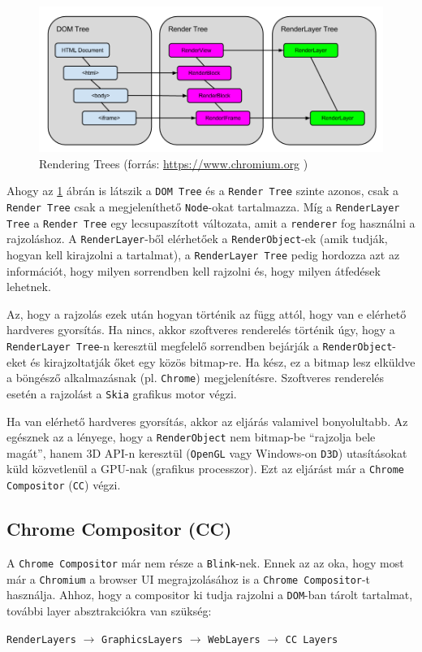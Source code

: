 \documentclass[12pt]{report}
\let\origurl\url
\renewcommand{\url}[1]{%
    \textcolor{blue}{\origurl{#1}}
}
\begin{document}
\begin{figure}[h]
    \centering
    \includegraphics[scale=0.45]{rendering_trees}
    \caption{
        \label{fig-rendering-trees}
        Rendering Trees (forrás: \url{https://www.chromium.org} \cite{bib-chromium-oopifs})
    }
\end{figure}

Ahogy az \ref{fig-rendering-trees} ábrán is látszik a \texttt{DOM Tree} és a
\texttt{Render Tree} szinte azonos, csak a \texttt{Render Tree} csak a megjeleníthető
\texttt{Node}-okat tartalmazza. Míg a \texttt{RenderLayer Tree} a \texttt{Render Tree} egy
lecsupaszított változata, amit a \texttt{renderer} fog használni a rajzoláshoz.
A \texttt{RenderLayer}-ből elérhetőek a \texttt{RenderObject}-ek (amik tudják, hogyan
kell kirajzolni a tartalmat), a \texttt{RenderLayer Tree} pedig hordozza azt az információt,
hogy milyen sorrendben kell rajzolni és, hogy milyen átfedések lehetnek.

Az, hogy a rajzolás ezek után hogyan történik az függ attól, hogy van e elérhető hardveres
gyorsítás. Ha nincs, akkor szoftveres renderelés történik úgy, hogy a \\
\texttt{RenderLayer Tree}-n keresztül megfelelő sorrendben bejárják a
\texttt{RenderObject}-eket és kirajzoltatják őket egy közös bitmap-re. Ha kész, ez a bitmap
lesz elküldve a böngésző alkalmazásnak (pl. \texttt{Chrome}) megjelenítésre. Szoftveres
renderelés esetén a rajzolást a \texttt{Skia} grafikus motor végzi.

Ha van elérhető hardveres gyorsítás, akkor az eljárás valamivel bonyolultabb. Az egésznek az
a lényege, hogy a \texttt{RenderObject} nem bitmap-be ``rajzolja bele magát'', hanem 3D API-n
keresztül (\texttt{OpenGL} vagy Windows-on \texttt{D3D}) utasításokat küld közvetlenül a
GPU-nak (grafikus processzor). Ezt az eljárást már a \texttt{Chrome Compositor} (\texttt{CC})
végzi.
\cite{bib-chromium-gpu, bib-chromium-oopifs}

\subsection{Chrome Compositor (CC)}
A \texttt{Chrome Compositor} már nem része a \texttt{Blink}-nek.
Ennek az az oka, hogy most már a \texttt{Chromium} a browser UI megrajzolásához is a
\texttt{Chrome Compositor}-t használja.
Ahhoz, hogy a compositor ki tudja rajzolni a \texttt{DOM}-ban tárolt tartalmat,
további layer absztrakciókra van szükség:
\begin{center}
    \texttt{RenderLayers} $\rightarrow$ \texttt{GraphicsLayers} $\rightarrow$
    \texttt{WebLayers} $\rightarrow$ \texttt{CC Layers}
\end{center}
\end{document}
